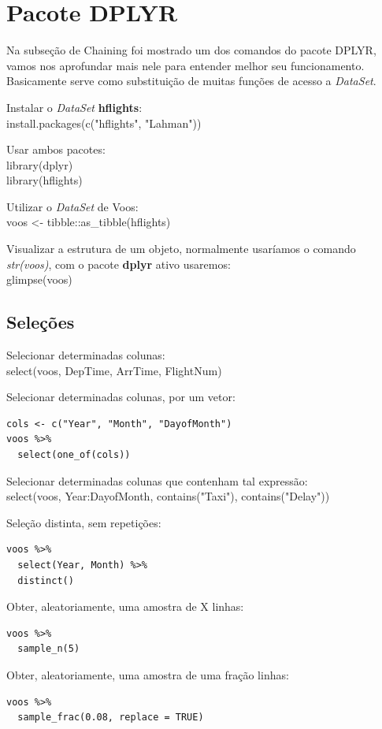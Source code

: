 \documentclass[a4paper,11pt]{article}
\begin{document}
\section{Pacote DPLYR}
Na subseção de Chaining foi mostrado um dos comandos do pacote DPLYR, vamos nos aprofundar mais nele para entender melhor seu funcionamento. Basicamente serve como substituição de muitas funções de acesso a \textit{DataSet}. 

Instalar o \textit{DataSet} \textbf{hflights}: \\
{\ttfamily install.packages(c("hflights", "Lahman"))}

Usar ambos pacotes: \\
{\ttfamily library(dplyr)} \\
{\ttfamily library(hflights)}

Utilizar o \textit{DataSet} de Voos: \\
{\ttfamily voos <- tibble::as\_tibble(hflights)}

Visualizar a estrutura de um objeto, normalmente usaríamos o comando \textit{str(voos)}, com o pacote \textbf{dplyr} ativo usaremos: \\
{\ttfamily glimpse(voos)}

\subsection{Seleções}
Selecionar determinadas colunas: \\
{\ttfamily select(voos, DepTime, ArrTime, FlightNum)}

Selecionar determinadas colunas, por um vetor:
\begin{lstlisting}
cols <- c("Year", "Month", "DayofMonth")
voos %>% 
  select(one_of(cols))
\end{lstlisting}

Selecionar determinadas colunas que contenham tal expressão: \\
{\ttfamily select(voos, Year:DayofMonth, contains("Taxi"), contains("Delay"))} 

Seleção distinta, sem repetições:
\begin{lstlisting}
voos %>% 
  select(Year, Month) %>%
  distinct()
\end{lstlisting}

Obter, aleatoriamente, uma amostra de X linhas:
\begin{lstlisting}
voos %>%
  sample_n(5)
\end{lstlisting}

Obter, aleatoriamente, uma amostra de uma fração linhas:
\begin{lstlisting}
voos %>%
  sample_frac(0.08, replace = TRUE)
\end{lstlisting}
\end{document}
